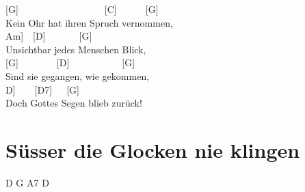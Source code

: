 \documentclass[
  letterpaper,
  a5paper]{memoir}
\begin{document}
{[}G{]}~~~~~~~~~~~~~~~~~~{[}C{]}~~~~~~{[}G{]}\\
Kein Ohr hat ihren Spruch vernommen,\\
\hspace*{0.333em}\hspace*{0.333em}\hspace*{0.333em}\hspace*{0.333em}\hspace*{0.333em}\hspace*{0.333em}\hspace*{0.333em}\hspace*{0.333em}\hspace*{0.333em}\hspace*{0.333em}\hspace*{0.333em}{[}Am{]}~~{[}D{]}~~~~~~~{[}G{]}\\
Unsichtbar jedes Menschen Blick,\\
{[}G{]}~~~~~~~~{[}D{]}~~~~~~~~~~~{[}G{]}\\
Sind sie gegangen, wie gekommen,\\
\hspace*{0.333em}\hspace*{0.333em}\hspace*{0.333em}\hspace*{0.333em}\hspace*{0.333em}\hspace*{0.333em}\hspace*{0.333em}\hspace*{0.333em}\hspace*{0.333em}\hspace*{0.333em}\hspace*{0.333em}\hspace*{0.333em}{[}D{]}~~~~{[}D7{]}~~~{[}G{]}\\
Doch Gottes Segen blieb zurück!

\hypertarget{suxfcsser-die-glocken-nie-klingen}{%
\chapter{Süsser die Glocken nie
klingen}\label{suxfcsser-die-glocken-nie-klingen}}

D G A7 D
\end{document}
